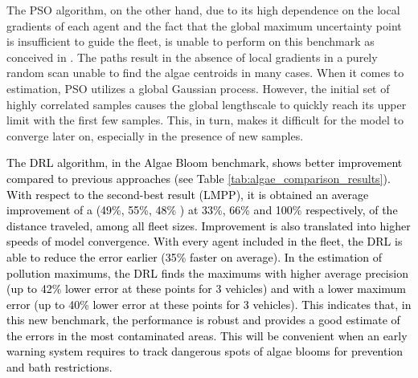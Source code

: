 \documentclass[journal]{IEEEtran}
\newcommand\changes[1]{\textcolor{black}{#1}}
\begin{document}
The PSO algorithm, on the other hand, due to its high dependence on the local gradients of each agent and the fact that the global maximum uncertainty point is insufficient to guide the fleet, is unable to perform on this benchmark as conceived in \cite{kathen_informative_2021}. The paths result in the absence of local gradients in a purely random scan unable to find the algae centroids in many cases. When it comes to estimation, PSO utilizes a global Gaussian process. However, the initial set of highly correlated samples causes the global lengthscale to quickly reach its upper limit with the first few samples. This, in turn, makes it difficult for the model to converge later on, especially in the presence of new samples.

\changes{The DRL algorithm, in the Algae Bloom benchmark, shows better improvement compared to previous approaches (see Table \ref{tab:algae_comparison_results}). With respect to the second-best result (LMPP), it is obtained an average improvement of a (49\%, 55\%, 48\% ) at 33\%, 66\% and 100\% respectively, of the distance traveled, among all fleet sizes. Improvement is also translated into higher speeds of model convergence. With every agent included in the fleet, the DRL is able to reduce the error earlier (35\% faster on average). In the estimation of pollution maximums, the DRL finds the maximums with higher average precision (up to 42\% lower error at these points for 3 vehicles) and with a lower maximum error (up to 40\% lower error at these points for 3 vehicles). This indicates that, in this new benchmark, the performance is robust and provides a good estimate of the errors in the most contaminated areas. This will be convenient when an early warning system requires to track dangerous spots of algae blooms for prevention and bath restrictions.}

\end{document}
